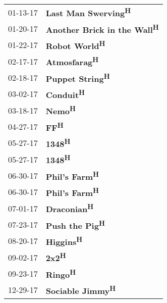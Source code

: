 \begin{supertabular}{p{0.25\columnwidth}p{0.75\columnwidth}}
 01-13-17 &          \textbf{Last Man Swerving\textsuperscript{H}} \\
 01-20-17 &  \textbf{Another Brick in the Wall\textsuperscript{H}} \\
 01-22-17 &                \textbf{Robot World\textsuperscript{H}} \\
 02-17-17 &                 \textbf{Atmosfarag\textsuperscript{H}} \\
 02-18-17 &              \textbf{Puppet String\textsuperscript{H}} \\
 03-02-17 &                    \textbf{Conduit\textsuperscript{H}} \\
 03-18-17 &                       \textbf{Nemo\textsuperscript{H}} \\
 04-27-17 &                         \textbf{FF\textsuperscript{H}} \\
 05-27-17 &                       \textbf{1348\textsuperscript{H}} \\
 05-27-17 &                       \textbf{1348\textsuperscript{H}} \\
 06-30-17 &                \textbf{Phil's Farm\textsuperscript{H}} \\
 06-30-17 &                \textbf{Phil's Farm\textsuperscript{H}} \\
 07-01-17 &                  \textbf{Draconian\textsuperscript{H}} \\
 07-23-17 &               \textbf{Push the Pig\textsuperscript{H}} \\
 08-20-17 &                    \textbf{Higgins\textsuperscript{H}} \\
 09-02-17 &                        \textbf{2x2\textsuperscript{H}} \\
 09-23-17 &                      \textbf{Ringo\textsuperscript{H}} \\
 12-29-17 &             \textbf{Sociable Jimmy\textsuperscript{H}} \\
\end{supertabular}
